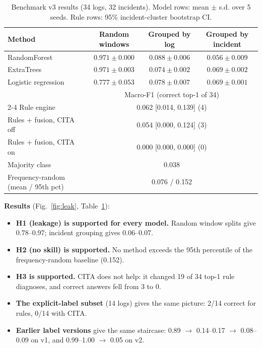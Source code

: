 \documentclass[10pt,a4paper]{article}
\begin{document}
\begin{table}[t]\centering\small
\caption{Benchmark v3 results (34 logs, 32 incidents). Model rows: mean
$\pm$ s.d. over 5 seeds. Rule rows: 95\% incident-cluster bootstrap CI.}
\label{tab:results}
\begin{tabular}{lccc}
\toprule
Method & Random windows & Grouped by log & Grouped by incident\\\midrule
RandomForest & $0.971\pm0.000$ & $0.088\pm0.006$ & $0.056\pm0.009$\\
ExtraTrees & $0.971\pm0.003$ & $0.074\pm0.002$ & $0.069\pm0.002$\\
Logistic regression & $0.777\pm0.053$ & $0.078\pm0.007$ & $0.069\pm0.001$\\\midrule
& \multicolumn{3}{c}{Macro-F1 (correct top-1 of 34)}\\\cmidrule{2-4}
Rule engine & \multicolumn{3}{c}{0.062 [0.014, 0.139] (4)}\\
Rules + fusion, CITA off & \multicolumn{3}{c}{0.054 [0.000, 0.124] (3)}\\
Rules + fusion, CITA on & \multicolumn{3}{c}{0.000 [0.000, 0.000] (0)}\\\midrule
Majority class & \multicolumn{3}{c}{0.038}\\
Frequency-random (mean / 95th pct) & \multicolumn{3}{c}{0.076 / 0.152}\\
\bottomrule
\end{tabular}
\end{table}

\textbf{Results} (Fig.~\ref{fig:leak}, Table~\ref{tab:results}):
\begin{itemize}
\item \textbf{H1 (leakage) is supported for every model.} Random window
      splits give 0.78--0.97; incident grouping gives 0.06--0.07.
\item \textbf{H2 (no skill) is supported.} No method exceeds the 95th
      percentile of the frequency-random baseline (0.152).
\item \textbf{H3 is supported.} CITA does not help: it changed 19 of 34 top-1
      rule diagnoses, and correct answers fell from 3 to 0.
\item \textbf{The explicit-label subset} (14 logs) gives the same picture:
      2/14 correct for rules, 0/14 with CITA.
\item \textbf{Earlier label versions} give the same staircase: 0.89 $\to$
      0.14--0.17 $\to$ 0.08--0.09 on v1, and 0.99--1.00 $\to$ 0.05 on v2.
\end{itemize}
\end{document}
